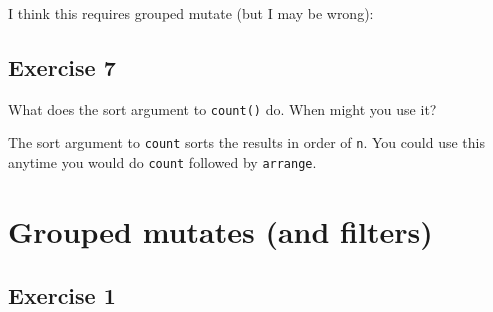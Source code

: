 \documentclass[]{book}
\newenvironment{Shaded}{\begin{snugshade}}{\end{snugshade}}
\newcommand{\CommentTok}[1]{\textcolor[rgb]{0.56,0.35,0.01}{\textit{#1}}}
\newcommand{\DataTypeTok}[1]{\textcolor[rgb]{0.13,0.29,0.53}{#1}}
\newcommand{\DecValTok}[1]{\textcolor[rgb]{0.00,0.00,0.81}{#1}}
\newcommand{\KeywordTok}[1]{\textcolor[rgb]{0.13,0.29,0.53}{\textbf{#1}}}
\newcommand{\NormalTok}[1]{#1}
\newcommand{\OperatorTok}[1]{\textcolor[rgb]{0.81,0.36,0.00}{\textbf{#1}}}
\newcommand{\OtherTok}[1]{\textcolor[rgb]{0.56,0.35,0.01}{#1}}
\newcommand{\StringTok}[1]{\textcolor[rgb]{0.31,0.60,0.02}{#1}}
\theoremstyle{plain}
\theoremstyle{remark}
\theoremstyle{definition}
\theoremstyle{definition}
\theoremstyle{definition}
\theoremstyle{remark}
\begin{document}
I think this requires grouped mutate (but I may be wrong):

\begin{Shaded}
\end{Shaded}

\hypertarget{exercise-7}{%
\subsection{Exercise 7}\label{exercise-7}}

What does the sort argument to \texttt{count()} do. When might you use
it?

The sort argument to \texttt{count} sorts the results in order of
\texttt{n}. You could use this anytime you would do \texttt{count}
followed by \texttt{arrange}.

\hypertarget{grouped-mutates-and-filters}{%
\section{Grouped mutates (and
filters)}\label{grouped-mutates-and-filters}}

\hypertarget{exercise-1-11}{%
\subsection{Exercise 1}\label{exercise-1-11}}
\end{document}
